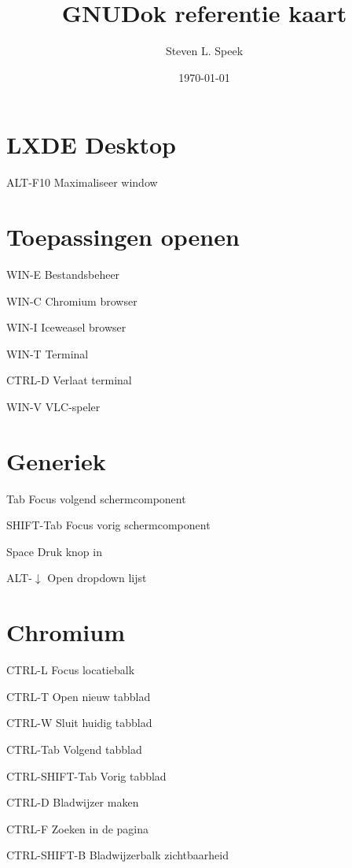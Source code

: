 \documentclass[10pt]{article}
\title{GNUDok referentie kaart}
\author{Steven L. Speek}
\date{\today{}}
\renewcommand{\maketitle}{%
{\begin{center}\Large \mythetitle\end{center}}
}
\begin{document}
\begin{multicols}{3}
	\maketitle

	\section{LXDE Desktop}
	\begin{ttdesc}[labelwidth=\widthof{\texttt{ALT-F10}}]
	\item[ALT-F10] Maximaliseer window
	\end{ttdesc}
	\section{Toepassingen openen}
	\begin{ttdesc}[labelwidth=\widthof{\texttt{WIN-SHIFT+E}}]
	\item[WIN-E] Bestandsbeheer
	\item[WIN-C] Chromium browser
	\item[WIN-I] Iceweasel browser
	\item[WIN-T] Terminal
	\item[CTRL-D] Verlaat terminal
	\item[WIN-V] VLC-speler
	\end{ttdesc}
	\section{Generiek}
	\begin{ttdesc}[labelwidth=\widthof{\texttt{SHIFT+Tab}}]
	\item[Tab] Focus volgend schermcomponent
	\item[SHIFT-Tab] Focus vorig schermcomponent
	\item[Space] Druk knop in
	\item[ALT-$\downarrow$] Open dropdown lijst
	\end{ttdesc}
	\section{Chromium}
	\begin{ttdesc}[labelwidth=\widthof{\texttt{CTRL+SHIFT-Tab}}]
	\item[CTRL-L] Focus locatiebalk
	\item[CTRL-T] Open nieuw tabblad
	\item[CTRL-W] Sluit huidig tabblad
	\item[CTRL-Tab] Volgend tabblad
	\item[CTRL-SHIFT-Tab] Vorig tabblad
	\item[CTRL-D] Bladwijzer maken
	\item[CTRL-F] Zoeken in de pagina
	\item[CTRL-SHIFT-B] Bladwijzerbalk zichtbaarheid
	\end{ttdesc}

\end{multicols}
\end{document}
